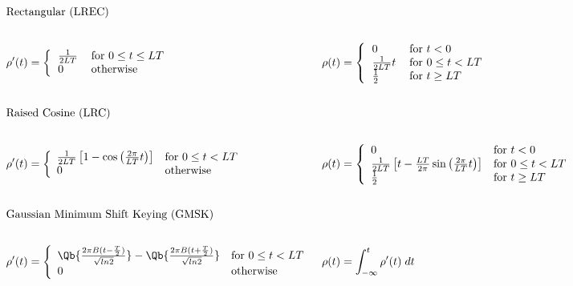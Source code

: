 \begin{fsL}
\begin{align*}
   \intertext{Rectangular (LREC)} \\
   \rho'(t) &=
      \left\{ 
         \begin{tabular}{ll}
            $\frac{1}{2LT}$   & for $0\le t \le LT$ \\
            $0$               & otherwise
         \end{tabular}
      \right.
&
   \rho(t) &= 
      \left\{ 
         \begin{tabular}{ll}
            $0$               & for $t<0$ \\
            $\frac{1}{2LT}t$  & for $0\le t< LT$ \\
            $\frac{1}{2}$     & for $t\ge LT$ 
         \end{tabular}
      \right.
\\ \\
   \intertext{Raised Cosine (LRC)} \\
   \rho'(t) &= 
      \left\{ 
         \begin{array}{ll}
            \frac{1}{2LT}\left[ 1 - \cos\left(\frac{2\pi}{LT}t\right) \right]  & \mbox{for } 0\le t< LT \\
            0              & \mbox{otherwise}
         \end{array}
      \right.
&
   \rho(t) &=
      \left\{ 
         \begin{array}{ll}
            0             & \mbox{for } t<0 \\
            \frac{1}{2LT}\left[ t - \frac{LT}{2\pi}\sin\left(\frac{2\pi}{LT}t\right) \right]  & \mbox{for } 0\le t< LT \\
            \frac{1}{2}   & \mbox{for } t\ge LT
         \end{array}
      \right.
\\ \\
   \intertext{Gaussian Minimum Shift Keying (GMSK)} \\
   \rho'(t) &= 
      \left\{ 
         \begin{array}{ll}
            \Qb{\frac{2\pi B(t-\frac{T}{2})}{\sqrt{ln2}}} -   
            \Qb{\frac{2\pi B(t+\frac{T}{2})}{\sqrt{ln2}}}
            & \mbox{for } 0\le t< LT \\
            0              & \mbox{otherwise}
         \end{array}
      \right.
&
   \rho(t) &=
      \int_{-\infty}^t \rho'(t) \; dt
\end{align*}
\end{fsL}

